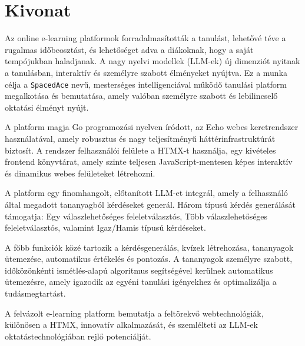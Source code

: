 \setcounter{page}{1}

\selecthungarian

\chapter*{Kivonat}

Az online e-learning platformok forradalmasították a tanulást, lehetővé téve a rugalmas időbeosztást, és lehetőséget adva a diákoknak, hogy a saját tempójukban haladjanak. A nagy nyelvi modellek (LLM-ek) új dimenziót nyitnak a tanulásban, interaktív és személyre szabott élményeket nyújtva. Ez a munka célja a \texttt{SpacedAce} nevű, mesterséges intelligenciával működő tanulási platform megalkotása és bemutatása, amely valóban személyre szabott és lebilincselő oktatási élményt nyújt.

A platform magja Go programozási nyelven íródott, az Echo webes keretrendszer használatával, amely robusztus és nagy teljesítményű háttérinfrastruktúrát biztosít. A rendszer felhasználói felülete a HTMX-t használja, egy kivételes frontend könyvtárat, amely szinte teljesen JavaScript-mentesen képes interaktív és dinamikus webes felületeket létrehozni.

A platform egy finomhangolt, előtanított LLM-et integrál, amely a felhasználó által megadott tananyagból kérdéseket generál. Három típusú kérdés generálását támogatja: Egy válaszlehetőséges feleletválasztós, Több válaszlehetőséges feleletválasztós, valamint Igaz/Hamis típusú kérdéseket.

A főbb funkciók közé tartozik a kérdésgenerálás, kvízek létrehozása, tananyagok ütemezése, automatikus értékelés és pontozás. A tananyagok személyre szabott, időközönkénti ismétlés-alapú algoritmus segítségével kerülnek automatikus ütemezésre, amely igazodik az egyéni tanulási igényekhez és optimalizálja a tudásmegtartást.

A felvázolt e-learning platform bemutatja a feltörekvő webtechnológiák, különösen a HTMX, innovatív alkalmazását, és szemlélteti az LLM-ek oktatástechnológiában rejlő potenciálját.



\vfill
\selectenglish


